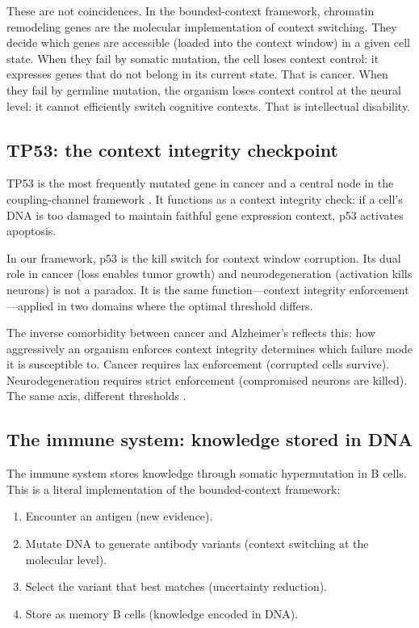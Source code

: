 \documentclass[11pt]{article}
\theoremstyle{definition}
\begin{document}
These are not coincidences. In the bounded-context framework,
chromatin remodeling genes are the molecular implementation of
context switching. They decide which genes are accessible
(loaded into the context window) in a given cell state. When they
fail by somatic mutation, the cell loses context control: it
expresses genes that do not belong in its current state. That is
cancer. When they fail by germline mutation, the organism loses
context control at the neural level: it cannot efficiently switch
cognitive contexts. That is intellectual disability.

\subsection{TP53: the context integrity checkpoint}

TP53 is the most frequently mutated gene in cancer
\cite{Kandoth2013} and a central node in the coupling-channel
framework \cite{McCarthy2026e}. It functions as a context
integrity check: if a cell's DNA is too damaged to maintain
faithful gene expression context, p53 activates apoptosis.

In our framework, p53 is the kill switch for context window
corruption. Its dual role in cancer (loss enables tumor growth)
and neurodegeneration (activation kills neurons) is not a paradox.
It is the same function---context integrity enforcement---applied
in two domains where the optimal threshold differs.

The inverse comorbidity between cancer and Alzheimer's
\cite{Driver2012, Musicco2013} reflects this: how aggressively an
organism enforces context integrity determines which failure mode
it is susceptible to. Cancer requires lax enforcement (corrupted
cells survive). Neurodegeneration requires strict enforcement
(compromised neurons are killed). The same axis, different
thresholds \cite{Behrens2009}.

\subsection{The immune system: knowledge stored in DNA}

The immune system stores knowledge through somatic hypermutation
in B cells. This is a literal implementation of the bounded-context
framework:

\begin{enumerate}
\item Encounter an antigen (new evidence).
\item Mutate DNA to generate antibody variants (context switching
at the molecular level).
\item Select the variant that best matches (uncertainty reduction).
\item Store as memory B cells (knowledge encoded in DNA).
\end{enumerate}
\end{document}
